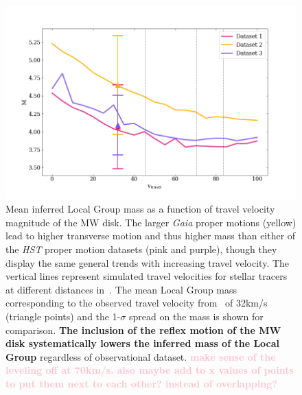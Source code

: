 \documentclass[twocolumn]{aastex631}
\newcommand{\kc}[1]{\textcolor{pink}{\textbf{#1}} }
\begin{document}
\begin{figure}[htb]
    \centering
    \includegraphics[width=\columnwidth]{analyze-runs-MvsV.png}
    \caption{\label{fig:mvsv} 
    Mean inferred Local Group mass as a function of travel velocity 
    magnitude of the MW disk. 
    The larger \textit{Gaia} proper motions (yellow) lead to higher transverse
    motion and thus higher mass than either of the \textit{HST} proper motion
    datasets (pink and purple), though they display the same general trends with increasing travel velocity. 
    The vertical lines represent simulated travel velocities for 
    stellar tracers at different distances in~\cite{Garavito-Camargo2021b}.
    The mean Local Group mass corresponding to the observed travel velocity 
    from~\cite{Petersen2021} of 32km/s (triangle points) and the 1-$\sigma$ 
    spread on the mass is shown for comparison. 
    \textbf{The inclusion of the reflex motion of the MW disk systematically 
    lowers the inferred mass of the Local Group} regardless of observational 
    dataset.
    \kc{make sense of the leveling off at 70km/s.}
    \kc{also maybe add to x values of points to put them next to each other? 
    instead of overlapping?}
    }
  \end{figure}
\end{document}
